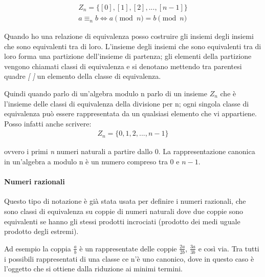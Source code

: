 \begin{align*}
    Z_n = \{[0], [1], [2], ..., [n-1]\}\\
    a \equiv_n b \Longleftrightarrow a \pmod n= b \pmod n
\end{align*}

\noindent Quando ho una relazione di equivalenza posso costruire gli insiemi degli insiemi che sono equivalenti tra di loro. L'insieme degli insiemi che sono equivalenti tra di loro forma una partizione dell'insieme di partenza; gli elementi della partizione vengono chiamati classi di equivalenza e si denotano mettendo tra parentesi quadre \textit{[ ]} un elemento della classe di equivalenza. 

Quindi quando parlo di un'algebra modulo n parlo di un insieme $Z_n$ che è l'insieme delle classi di equivalenza della divisione per n; ogni singola classe di equivalenza può essere rappresentata da un qualsiasi elemento che vi appartiene. Posso infatti anche scrivere:
\begin{align*}
    Z_n = \{0, 1, 2, ..., n-1\}
\end{align*}

\noindent ovvero i primi \textit{n} numeri naturali a partire dallo $0$. La rappresentazione canonica in un'algebra a modulo n è un numero compreso tra $0$ e $n-1$.\\

\noindent{}

\paragraph*{Numeri razionali} Questo tipo di notazione è già stata usata per definire i numeri razionali, che sono classi di equivalenza su coppie di numeri naturali dove due coppie sono equivalenti se hanno gli stessi prodotti incrociati (prodotto dei medi uguale prodotto degli estremi). 

Ad esempio la coppia ${\frac{a}{b}}$ è un rappresentate delle coppie ${\frac{2a}{2b}}$, ${\frac{3a}{3b}}$ e così via. Tra tutti i possibili rappresentati di una classe ce n'è uno canonico, dove in questo caso è l'oggetto che si ottiene dalla riduzione ai minimi termini.

